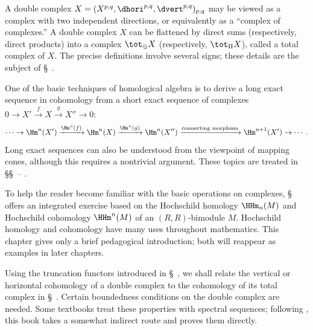 A double complex
$X=(X^{p,q},\dhori^{p,q},\dvert^{p,q})_{p,q}$ may be viewed as a complex
with two independent directions, or equivalently as a ``complex of
complexes.'' A double complex $X$ can be flattened by direct sums
(respectively, direct products) into a complex $\tot_{\oplus}X$
(respectively, $\tot_{\Pi}X$), called a total complex of $X$. The precise
definitions involve several signs; these details are the subject of
\S~.

One of the basic techniques of homological algebra is to derive a long exact
sequence in cohomology from a short exact sequence of complexes
$0\to X'\xrightarrow{f}X\xrightarrow{g}X''\to0$:
\[
  \cdots \to \Hm^n(X') \xrightarrow{\Hm^n(f)} \Hm^n(X)
  \xrightarrow{\Hm^n(g)} \Hm^n(X'')
  \xrightarrow{\text{connecting morphism}} \Hm^{n+1}(X') \to \cdots .
\]
Long exact sequences can also be understood from the viewpoint of mapping
cones, although this requires a nontrivial argument. These topics are treated
in \S\S~--%
.

To help the reader become familiar with the basic operations on complexes,
\S~ offers an integrated exercise based on the
Hochschild homology $\HHm_n(M)$ and Hochschild cohomology $\HHm^n(M)$ of an
$(R,R)$-bimodule $M$. Hochschild homology and cohomology have many uses
throughout mathematics. This chapter gives only a brief pedagogical
introduction; both will reappear as examples in later chapters.

Using the truncation functors introduced in
\S~, we shall relate the
vertical or horizontal cohomology of a double complex to the cohomology of
its total complex in \S~. Certain
boundedness conditions on the double complex are needed. Some textbooks
treat these properties with spectral sequences; following \cite{KS06}, this
book takes a somewhat indirect route and proves them directly.

